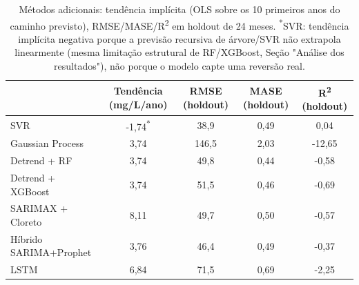 \begin{table}[H]
    \centering
    \begin{tabular}{l|c|c|c|c}
         & Tendência (mg/L/ano) & RMSE (holdout) & MASE (holdout) & R\textsuperscript{2} (holdout) \\ \hline
        SVR & -1,74\textsuperscript{*} & 38,9 & 0,49 & 0,04 \\
        Gaussian Process & 3,74 & 146,5 & 2,03 & -12,65 \\
        Detrend + RF & 3,74 & 49,8 & 0,44 & -0,58 \\
        Detrend + XGBoost & 3,74 & 51,5 & 0,46 & -0,69 \\
        SARIMAX + Cloreto & 8,11 & 49,7 & 0,50 & -0,57 \\
        Híbrido SARIMA+Prophet & 3,76 & 46,4 & 0,49 & -0,37 \\
        LSTM & 6,84 & 71,5 & 0,69 & -2,25 \\
    \end{tabular}
    \caption{Métodos adicionais: tendência implícita (OLS sobre os 10 primeiros anos do caminho previsto), RMSE/MASE/R\textsuperscript{2} em holdout de 24 meses. \textsuperscript{*}SVR: tendência implícita negativa porque a previsão recursiva de árvore/SVR não extrapola linearmente (mesma limitação estrutural de RF/XGBoost, Seção "Análise dos resultados"), não porque o modelo capte uma reversão real.}
    \label{tab:metodos-adicionais}
\end{table}
